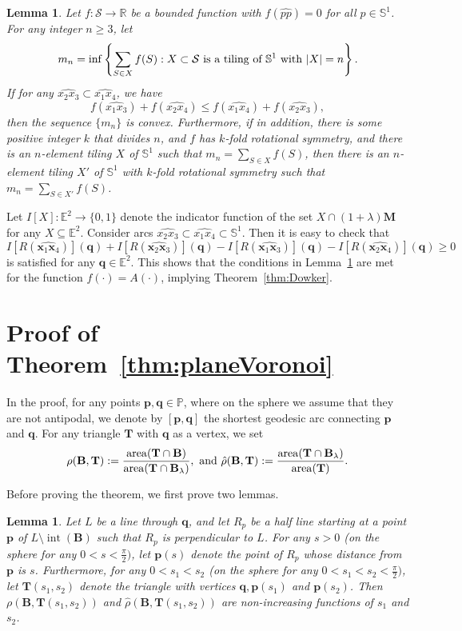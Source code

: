 \documentclass[11pt]{amsart}
\newcommand{\Eu}{\mathbb{E}}
\renewcommand{\Re}{\mathbb R}
\newcommand{\BB}{\mathbf{B}}
\newcommand{\PPP}{\mathbb{P}}
\newcommand{\MM}{\mathbf{M}}
\renewcommand{\S}{\mathbb{S}}
\newcommand{\x}{\mathbf{x}}
\newcommand{\q}{\mathbf{q}}
\newcommand{\p}{\mathbf{p}}
\newcommand{\TT}{\mathbf{T}}
\DeclareMathOperator{\area}{area}
\DeclareMathOperator{\inter}{int}
\newtheorem{lemma}[theorem]{Lemma}
\theoremstyle{definition}
\numberwithin{equation}{section}
\begin{document}
\begin{lemma}\label{lem:functional}
Let $f : \mathcal{S} \to \Re$ be a bounded function with $f(\widehat{pp})=0$ for all $p \in \S^1$. For any integer $n \geq 3$, let
\[
m_n = \inf  \left\{  \sum_{S \in X} f( S ) : X \subset \mathcal{S} \hbox{ is a tiling of } \S^1 \hbox{ with } |X| = n \right\}.
\]
If for any $\widehat{x_2x_3} \subset \widehat{x_1x_4}$, we have
\[
f(\widehat{x_1x_3})+f(\widehat{x_2x_4}) \leq f(\widehat{x_1x_4})+f(\widehat{x_2x_3}),
\]
then the sequence $\{ m_n \}$ is convex.
Furthermore, if in addition, there is some positive integer $k$ that divides $n$, and $f$ has $k$-fold rotational symmetry, and there is an $n$-element tiling  $X$ of $\S^1$ such that $m_n = \sum_{S \in X} f(S)$, then there is an $n$-element tiling $X'$ of $\S^1$ with $k$-fold rotational symmetry such that $m_n = \sum_{S \in X' } f(S)$.
\end{lemma}

Let $I[X] : \Eu^2 \to \{ 0,1\}$ denote the indicator function of the set $X \cap (1+\lambda) \MM$ for any $X \subseteq \Eu^2$. Consider arcs $\widehat{x_2x_3} \subset \widehat{x_1x_4} \subset \mathbb{S}^1$. Then it is easy to check that
\[
I[R(\widehat{\x_1\x_4})](\q)+ I[R(\widehat{\x_2\x_3})](\q) - I[R(\widehat{\x_1\x_3})](\q) - I[R(\widehat{\x_2\x_4})](\q) \geq 0
\]
is satisfied for any $\q \in \Eu^2$. This shows that the conditions in Lemma~\ref{lem:functional} are met for the function $f(\cdot) = A(\cdot)$, implying Theorem~\ref{thm:Dowker}.





\section{Proof of Theorem~\ref{thm:planeVoronoi}}



In the proof, for any points $\p, \q \in \PPP$, where on the sphere we assume that they are not antipodal, we denote by $[\p,\q]$ the shortest geodesic arc connecting $\p$ and $\q$.  For any triangle $\TT$ with $\q$ as a vertex, we set
\[
\rho(\BB,\TT) := \frac{\area(\TT \cap \BB)}{\area(\TT \cap \BB_{\lambda})}, \hbox{ and } \hat{\rho}(\BB,\TT) := \frac{\area(\TT \cap \BB_{\lambda})}{\area(\TT)}.
\]


Before proving the theorem, we first prove two lemmas.

\begin{lemma}\label{lem:constcurv1}
Let $L$ be a line through $\q$, and let $R_p$ be a half line starting at a point $\p$ of $L \setminus \inter (\BB)$ such that $R_p$ is perpendicular to $L$. For any $s >0 $ (on the sphere for any $0 < s < \frac{\pi}{2})$, let $\p(s)$ denote the point of $R_p$ whose distance from $\p$ is $s$. Furthermore, for any $0 < s_1 < s_2$ (on the sphere for any $0 < s_1 < s_2 < \frac{\pi}{2})$, let $\TT(s_1,s_2)$ denote the triangle with vertices $\q, \p(s_1)$ and $\p(s_2)$. Then $\rho(\BB,\TT(s_1,s_2))$ and $\hat{\rho}(\BB,\TT(s_1,s_2))$ are non-increasing functions of $s_1$ and $s_2$.
\end{lemma}
\end{document}
